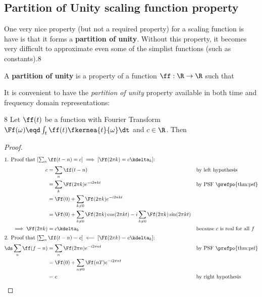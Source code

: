 \subsection{Partition of Unity scaling function property}
One very nice property (but not a required property) for a scaling
function is have is that it forms a {\bf partition of unity}.
Without this property, it becomes very difficult to approximate
even some of the simplist functions (such as constants).\citep{jawerth}{8}
\begin{definition}
A {\bf partition of unity} is a property of a function
$\ff:\R\to\R$ such that
\end{definition}

It is convenient to have the {\em partition of unity} property
available in both time and frequency domain representations:
\begin{lemma}
\citep{jawerth}{8}
\label{lem:unity}
Let $\ff(t)$ be a function with Fourier Transform
$\Ff(\omega)\eqd\int_t\ff(t)\fkernea{t}{\omega}\dt$ and
$c\in\R$.
Then
\end{lemma}
\begin{proof}
\begin{align*}
\intertext{1. Proof that
  $\left[ \sum_n \ff(t-n)=c \right] \implies \left[ \Ff(2\pi k) = c\kdelta_k \right]$:
  }
   c
     &= \sum_n \ff(t-n)
     && \text{by left hypothesis}
   \\&= \sum_k \Ff(2\pi k) e^{-i2\pi kt}
     && \text{by PSF \prefpo{thm:psf}}
   \\&= \Ff(0) + \sum_{k\ne 0} \Ff(2\pi k) e^{-i2\pi k t}
   \\&= \Ff(0) + \sum_{k\ne 0} \Ff(2\pi k) \cos(2\pi kt)
                     - i\sum_{k\ne 0} \Ff(2\pi k) \sin(2\pi kt)
   \\ \implies
   \Ff(2\pi k) &= c\kdelta_k
     && \text{because $c$ is real for all $f$}
\\
\intertext{2. Proof that
  $\left[ \sum_n \ff(t-n)=c \right] \impliedby \left[ \Ff(2\pi k) = c\kdelta_k \right]$:
  }
  \ds \sum_n \ff(f -n)
     &= \sum_n \Ff(2\pi n) e^{-i2\pi nt}
     && \text{by PSF \prefpo{thm:psf}}
   \\&= \Ff(0) + \sum_{n\ne0} \Ff(nT) e^{-i2\pi nt}
   \\&= c
     && \text{by right hypothesis}
\end{align*}
\end{proof}

